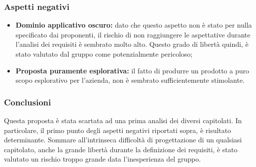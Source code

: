 \subsubsection{Aspetti negativi}
\label{aspettineg4}
\begin{itemize}
\item\textbf{Dominio applicativo oscuro:} dato che questo aspetto non è stato per nulla specificato dai proponenti, il rischio di non raggiungere le aspettative durante l'analisi dei requisiti è sembrato molto alto. Questo grado di libertà quindi, è stato valutato dal gruppo come potenzialmente pericoloso;
\item\textbf{Proposta puramente esplorativa:} il fatto di produrre un prodotto a puro scopo esplorativo per l'azienda, non è sembrato sufficientemente stimolante.
\end{itemize}

\subsubsection{Conclusioni}
\label{conclusioni4}
Questa proposta è stata scartata ad una prima analisi dei diversi capitolati. In particolare, il primo punto degli aspetti negativi riportati sopra, è risultato determinante. Sommare all'intrinseca difficoltà di progettazione di un qualsiasi capitolato, anche la grande libertà durante la definizione dei requisiti, è stato valutato un rischio troppo grande data l'inesperienza del gruppo.